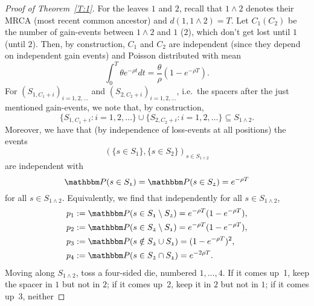 \documentclass[preprint,authoryear]{elsarticle}
\theoremstyle{definition}
\numberwithin{equation}{section}
\numberwithin{figure}{section}
\begin{document}
\begin{proof}[Proof of Theorem~\ref{T:1}]
  For the leaves $\mathfrak 1$ and $\mathfrak 2$, recall that
  $\mathfrak 1\wedge\mathfrak 2$ denotes their MRCA (most recent
  common ancestor) and $d(\mathfrak 1, \mathfrak 1\wedge\mathfrak 2) = T$. Let $C_{\mathfrak 1} (C_{\mathfrak 2})$ be the
  number of gain-events between $\mathfrak 1\wedge\mathfrak 2$ and
  $\mathfrak 1$ ($\mathfrak 2$), which don't get lost until
  $\mathfrak 1$ (until $\mathfrak 2$). Then, by construction,
  $C_{\mathfrak 1}$ and $C_{\mathfrak 2}$ are independent (since they
  depend on independent gain events) and Poisson distributed with mean
  $$ \int_{0}^{T} \theta e^{-\rho t}  
  dt = \frac\theta\rho(1-e^{-\rho T}).$$
  For $(S_{\mathfrak 1, C_{\mathfrak 1} + i})_{i=1,2,\dots}$ and
  $(S_{\mathfrak 2, C_{\mathfrak 2} + i})_{i=1,2,\dots}$, i.e.\ the
  spacers after the just mentioned gain-events, we note that, by
  construction,
  $$ \{S_{\mathfrak 1, C_{\mathfrak 1} + i}: i=1,2,\dots\} \cup 
  \{S_{\mathfrak 2, C_{\mathfrak 2} + i}: i=1,2,\dots\} \subseteq
  S_{\mathfrak 1 \wedge\mathfrak 2}.$$
  Moreover, we have that (by independence of loss-events at all
  positions) the events
  $$ (\{s \in S_{\mathfrak 1}\}, \{s\in S_{\mathfrak 2}\})_{s\in S_{\mathfrak 1 \wedge\mathfrak 2}}$$
  are independent with
  $$ \mathbbm P(s\in S_{\mathfrak 1}) =  \mathbbm P(s\in S_{\mathfrak 2}) = e^{-\rho T}$$
  for all $s\in S_{\mathfrak 1 \wedge\mathfrak 2}$. Equivalently, we
  find that independently for all
  $s\in S_{\mathfrak 1 \wedge \mathfrak 2}$,
  \begin{equation}\label{eq:p14}
    \begin{aligned}
      p_1 &:= \mathbbm P(s\in S_{\mathfrak 1}\setminus S_{\mathfrak
        2}) = e^{-\rho T}(1-e^{-\rho T}),
      \\
      p_2 & := \mathbbm P(s\in S_{\mathfrak 2}\setminus S_{\mathfrak
        1}) = e^{-\rho T}(1-e^{-\rho T}),
      \\
      p_3 & := \mathbbm P(s\notin S_{\mathfrak 2}\cup S_{\mathfrak 1})
      = (1-e^{-\rho T})^2,
      \\
      p_4 & := \mathbbm P(s\in S_{\mathfrak 2}\cap S_{\mathfrak 1}) =
      e^{-2\rho T}.
    \end{aligned}
  \end{equation}
  Moving along $S_{\mathfrak 1\wedge \mathfrak 2}$, toss a four-sided
  die, numbered $1,\dots,4$. If it comes up~1, keep the spacer in
  $\mathfrak 1$ but not in $\mathfrak 2$; if it comes up~2, keep it in
  $\mathfrak 2$ but not in $\mathfrak 1$; if it comes up~3, neither

\end{proof}
\end{document}
